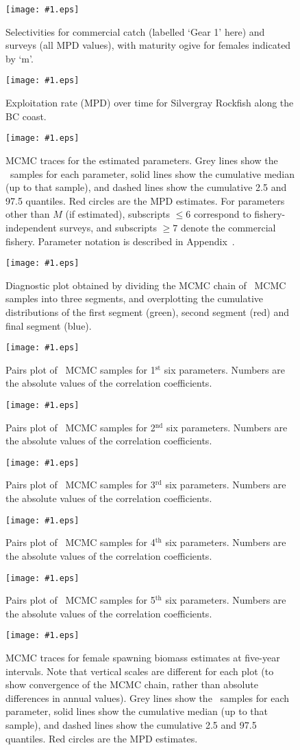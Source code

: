 \documentclass[11pt]{book}
\newcommand\onefig[2]{    %
  \begin{figure}[!htp]
  \begin{center}
	\texttt{[image: \#1.eps]} \\  %
  \end{center}
  \caption{#2 }
  \label{fig:#1} 
  \end{figure}
}
\begin{document}
\onefig{selectivity}{Selectivities for commercial catch (labelled `Gear 1' here) and surveys (all MPD values), with maturity ogive for females indicated by `m'.}

\onefig{exploit}{Exploitation rate (MPD) over time for Silvergray Rockfish along the BC coast.}




\onefig{traceParams}{MCMC traces for the estimated parameters. Grey lines show the \numMCMC~samples for each parameter, solid lines show the cumulative median (up to that sample), and dashed lines show the cumulative 2.5 and 97.5 quantiles.  Red circles are the MPD estimates. For parameters other than $M$ (if estimated), subscripts $\leq 6$ correspond to fishery-independent surveys, and subscripts $\geq 7$ denote the commercial fishery. Parameter notation is described in Appendix~\eqnchapter.}


\onefig{splitChain}{Diagnostic plot obtained by dividing the MCMC chain of \numMCMC~MCMC samples into three segments, and overplotting the cumulative distributions of the first segment (green), second segment (red) and final segment (blue).}

\onefig{pairs1}{Pairs plot of \numMCMC~MCMC samples for 1$^\text{st}$ six parameters. Numbers are the absolute values of the correlation coefficients.}
\onefig{pairs2}{Pairs plot of \numMCMC~MCMC samples for 2$^\text{nd}$ six parameters. Numbers are the absolute values of the correlation coefficients.}
\onefig{pairs3}{Pairs plot of \numMCMC~MCMC samples for 3$^\text{rd}$ six parameters. Numbers are the absolute values of the correlation coefficients.}
\onefig{pairs4}{Pairs plot of \numMCMC~MCMC samples for 4$^\text{th}$ six parameters. Numbers are the absolute values of the correlation coefficients.}
\onefig{pairs5}{Pairs plot of \numMCMC~MCMC samples for 5$^\text{th}$ six parameters. Numbers are the absolute values of the correlation coefficients.}







\onefig{traceBiomass}{MCMC traces for female spawning biomass estimates at five-year intervals.  Note that vertical scales are different for each plot (to show convergence of the MCMC chain, rather than absolute differences in annual values). Grey lines show the \numMCMC~samples for each parameter, solid lines show the cumulative  median (up to that sample), and dashed lines show the cumulative  2.5 and 97.5 quantiles.  Red circles are the MPD estimates.}
\end{document}
